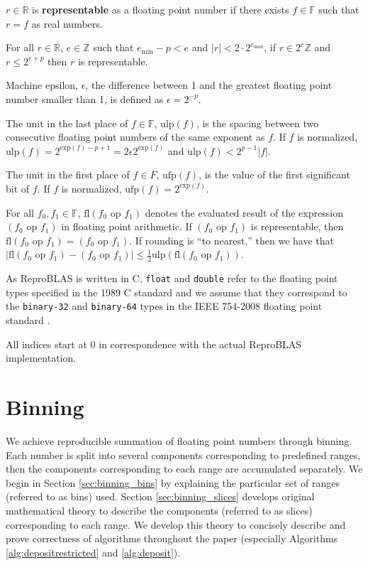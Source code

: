 \documentclass[12pt]{article}
\providecommand{\R}{\ensuremath{\mathbb{R}}}
\providecommand{\F}{\ensuremath{\mathbb{F}}}
\providecommand{\Z}{\ensuremath{\mathbb{Z}}}
\providecommand{\exp}{\ensuremath{\text{exp}}}
\providecommand{\min}{\ensuremath{\text{min}}}
\providecommand{\max}{\ensuremath{\text{max}}}
\providecommand{\ulp}{\ensuremath{\text{ulp}}}
\providecommand{\ufp}{\ensuremath{\text{ufp}}}
\providecommand{\fl}{\ensuremath{\text{fl}}}
\theoremstyle{definition}
\numberwithin{equation}{section}
\numberwithin{figure}{section}
\begin{document}
  $r \in \R$ is \textbf{representable} as a floating point number if there exists $f \in \F$ such that $r = f$ as real numbers.

  For all $r \in \R$, $e \in \Z$ such that $e_{\min} - p < e$ and $|r| < 2 \cdot 2^{e_{\max}}$, if $r \in 2^e\Z$ and $r \leq 2^{e + p}$ then $r$ is representable.

  Machine epsilon, $\epsilon$, the difference between 1 and the greatest floating point number smaller than 1, is defined as $\epsilon = 2^{-p}$.

  The unit in the last place of $f \in \F$, $\ulp(f)$, is the spacing between two consecutive floating point numbers of the same exponent as $f$. If $f$ is normalized, $\ulp(f) = 2^{\exp(f) - p + 1} = 2  \epsilon  2^{\exp(f)}$ and $\ulp(f) < 2^{p - 1}|f|$.

  The unit in the first place of $f \in F$, $\ufp(f)$, is the value of the first significant bit of $f$. If $f$ is normalized, $\ufp(f) = 2^{\exp(f)}$.

  For all $f_0, f_1 \in \F$, $\fl(f_0 \text{ op } f_1)$ denotes the evaluated result of the expression $(f_0 \text{ op } f_1)$ in floating point arithmetic. If $(f_0 \text{ op } f_1)$ is representable, then $\fl(f_0 \text{ op } f_1) = (f_0 \text{ op } f_1)$. If rounding is ``to nearest,'' then we have that $|\fl(f_0 \text{ op } f_1) - (f_0 \text{ op } f_1)| \leq \frac{1}{2}\ulp(\fl(f_0 \text{ op } f_1))$.

  As ReproBLAS is written in C, \texttt{float} and \texttt{double} refer to the floating point types specified in the 1989 C standard \cite{c89} and we assume that they correspond to the \texttt{binary-32} and \texttt{binary-64} types in the IEEE 754-2008 floating point standard \cite{ieee754}.

  All indices start at $0$ in correspondence with the actual ReproBLAS implementation.
\section{Binning}
  \label{sec:binning}
    We achieve reproducible summation of floating point numbers through binning. Each number is split into several components corresponding to predefined ranges, then the components corresponding to each range are accumulated separately. We begin in Section \ref{sec:binning_bins} by explaining the particular set of ranges (referred to as bins) used. Section \ref{sec:binning_slices} develops original mathematical theory to describe the components (referred to as slices) corresponding to each range. We develop this theory to concisely describe and prove correctness of algorithms throughout the paper (especially Algorithms \ref{alg:depositrestricted} and \ref{alg:deposit}).
\end{document}
